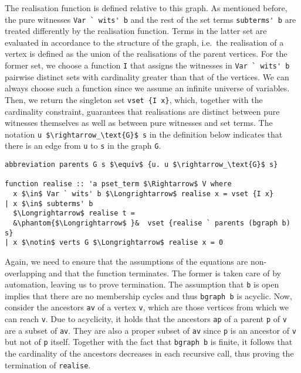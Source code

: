 \documentclass[sigplan,10pt,anonymous,review]{acmart}
\begin{document}
The realisation function is defined relative to this graph.
As mentioned before, the pure witnesses \lstinline!Var ` wits' b! and the rest of the set terms \lstinline!subterms' b! are treated differently by the realisation function.
Terms in the latter set are evaluated in accordance to the structure of the graph, i.e.\ the realisation of a vertex is defined as the union of the realisations of the parent vertices. 
For the former set, we choose a function \lstinline!I! that assigns the witnesses in \lstinline!Var ` wits' b! pairwise distinct sets with cardinality greater than that of the vertices.
We can always choose such a function since we assume an infinite universe of variables.
Then, we return the singleton set \lstinline!vset {I x}!, which, together with the cardinality constraint, guarantees that realisations are distinct between pure witnesses themselves as well as between pure witnesses and set terms.  
The notation \lstinline!u $\rightarrow_\text{G}$ s! in the definition below indicates that there is an edge from \lstinline!u! to \lstinline!s! in the graph \lstinline!G!.
\begin{lstlisting}
abbreviation parents G s $\equiv$ {u. u $\rightarrow_\text{G}$ s}

function realise :: 'a pset_term $\Rightarrow$ V where
  x $\in$ Var ` wits' b $\Longrightarrow$ realise x = vset {I x}
| x $\in$ subterms' b
  $\Longrightarrow$ realise t =
  &\phantom{$\Longrightarrow$ }&  vset {realise ` parents (bgraph b) s}
| x $\notin$ verts G $\Longrightarrow$ realise x = 0
\end{lstlisting}

Again, we need to ensure that the assumptions of the equations are non-overlapping and that the function terminates.
The former is taken care of by automation, leaving us to prove termination.
The assumption that \lstinline!b! is open implies that there are no membership cycles and thus \lstinline!bgraph b! is acyclic.
Now, consider the ancestors \lstinline!av! of a vertex \lstinline!v!, which are those vertices from which we can reach \lstinline!v!.
Due to acyclicity, it holds that the ancestors \lstinline!ap! of a parent \lstinline!p! of \lstinline!v! are a subset of \lstinline!av!.
They are also a proper subset of \lstinline!av! since \lstinline!p! is an ancestor of \lstinline!v! but not of \lstinline!p! itself.
Together with the fact that \lstinline!bgraph b! is finite, it follows that the cardinality of the ancestors decreases in each recursive call, thus proving the termination of \lstinline!realise!.
\end{document}
